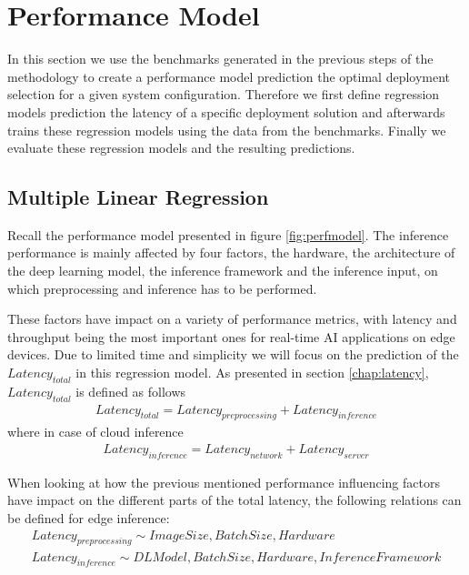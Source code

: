 \section{Performance Model}
\label{chap:perfModel}
In this section we use the benchmarks generated in the previous steps of the methodology to create a performance model prediction the optimal deployment selection for a given system configuration.
Therefore we first define regression models prediction the latency of a specific deployment solution and afterwards trains these regression models using the data from the benchmarks.
Finally we evaluate these regression models and the resulting predictions.



\subsection{Multiple Linear Regression}
Recall the performance model presented in figure \ref{fig:perfmodel}.
The inference performance is mainly affected by four factors, the hardware, the architecture of the deep learning model, the inference framework and the inference input, on which preprocessing and inference has to be performed.

These factors have impact on a variety of performance metrics, with latency and throughput being the most important ones for real-time AI applications on edge devices.
Due to limited time and simplicity we will focus on the prediction of the $Latency_{total}$ in this regression model.
As presented in section \ref{chap:latency}, $Latency_{total}$ is defined as follows
\begin{equation*}
\begin{gathered}
Latency_{total} = Latency_{preprocessing}  + Latency_{inference}
\end{gathered}
\end{equation*}
where in case of cloud inference
\begin{equation*}
\begin{gathered}
Latency_{inference} = Latency_{network}  + Latency_{server}
\end{gathered}
\end{equation*}

When looking at how the previous mentioned performance influencing factors have impact on the different parts of the total latency, the following relations can be defined for edge inference:
\begin{equation*}
\begin{gathered}
 Latency_{preprocessing}\sim ImageSize, BatchSize, Hardware\\
 Latency_{inference} \sim DLModel, BatchSize, Hardware, Inference Framework\\
\end{gathered}
\end{equation*}

